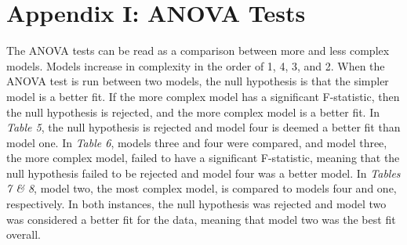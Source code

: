 \documentclass[12pt]{article}
\begin{document}
\section*{Appendix I: ANOVA Tests}
\begin{doublespace}
	The ANOVA tests can be read as a comparison between more and less complex models. Models increase in complexity in the order of 1, 4, 3, and 2. When the ANOVA test is run between two models, the null hypothesis is that the simpler model is a better fit. If the more complex model has a significant F-statistic, then the null hypothesis is rejected, and the more complex model is a better fit. In \textit{Table 5}, the null hypothesis is rejected and  model four is deemed a better fit than model one. In \textit{Table 6}, models three and four were compared, and model three, the more complex model, failed to have a significant F-statistic, meaning that the null hypothesis failed to be rejected and model four was a better model. In \textit{Tables 7 \& 8}, model two, the most complex model, is compared to models four and one, respectively. In both instances, the null hypothesis was rejected and model two was considered a better fit for the data, meaning that model two was the best fit overall.
	
\end{doublespace}
 
	
	
\end{document}
